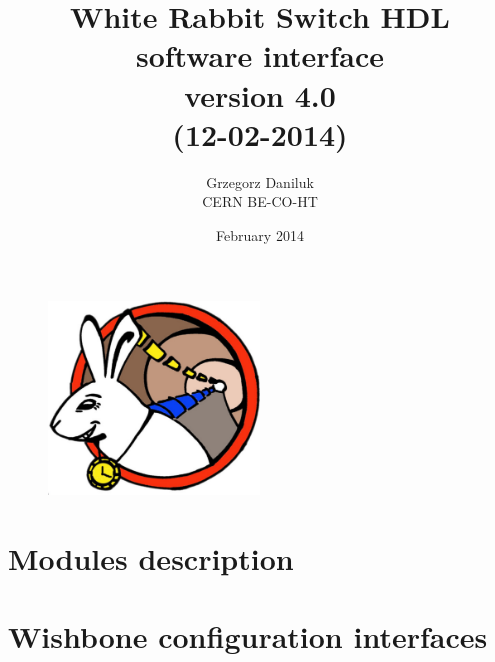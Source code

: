 \documentclass[a4paper, 12pt]{article}
\begin{document}
\title{White Rabbit Switch HDL\\ software interface\\\normalsize
{version 4.0}\\\small{(12-02-2014)}}
\author{Grzegorz Daniluk\\ CERN BE-CO-HT}

\date{February 2014}
\maketitle
\thispagestyle{empty}

\begin{figure}[ht!]
  \centering
  \vspace{1.3cm}
  \includegraphics[width=0.50\textwidth]{logo/WRlogo.pdf}
  \label{fig:wr_logo}
\end{figure}

\newpage

\newpage

\newpage

\tableofcontents

\newpage



\section{Modules description}














\newpage
\section{Wishbone configuration interfaces}

\newpage

\newpage


\newpage

\newpage

\newpage

\newpage

\newpage

\newpage

\newpage

\newpage

\newpage

\newpage

\newpage

\end{document}
